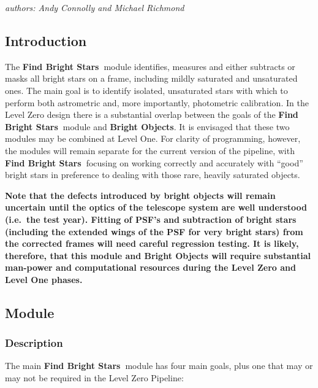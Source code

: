 
\def \fbs{{\bf Find Bright Stars\ }}

\medskip
\centerline {\it authors: Andy Connolly and Michael Richmond}

\subsection{Introduction}

The \fbs module identifies, measures and either 
subtracts or masks all
bright stars on a frame, including mildly saturated and unsaturated ones.
The main goal is to identify isolated, unsaturated stars with which
to perform both astrometric and, more importantly, photometric calibration.
In the Level Zero design there is a substantial overlap between the goals
of the \fbs module and {\bf Bright Objects}. It is
envisaged that these two modules may be combined at Level One. For
clarity of programming, however, the modules will remain separate for the
current version of the pipeline, with \fbs focusing
on working correctly and accurately with ``good'' bright stars
in preference to dealing with those rare, heavily saturated objects.

{\bf Note that the defects introduced by bright objects will
remain uncertain until the optics of the telescope system are well
understood (i.e.\ the test year). Fitting of PSF's and subtraction of 
bright stars (including the extended wings of the PSF for very bright
stars) from the corrected frames will need 
careful regression testing.
It is likely, therefore, that this module and {\bf Bright Objects}
will require substantial 
man-power and computational resources during the Level Zero
and Level One phases.}

\subsection {Module}

\subsubsection {Description}

  The main \fbs module has four main goals, plus one that may or may
not be required in the Level Zero Pipeline:

